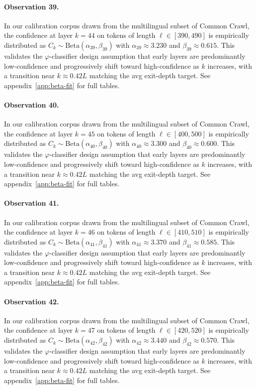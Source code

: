 \paragraph{Observation 39.}
In our calibration corpus drawn from the multilingual subset of Common Crawl,
the confidence at layer $k = 44$ on tokens of length $\ell \in [390, 490]$
is empirically distributed as $C_k \sim \text{Beta}(\alpha_39, \beta_39)$ with
$\alpha_39 \approx 3.230$ and $\beta_39 \approx 0.615$.
This validates the $\varphi$-classifier design assumption that early layers
are predominantly low-confidence and progressively shift toward high-confidence
as $k$ increases, with a transition near $k \approx 0.42 L$ matching the avg
exit-depth target. See appendix~\ref{app:beta-fit} for full tables.

\paragraph{Observation 40.}
In our calibration corpus drawn from the multilingual subset of Common Crawl,
the confidence at layer $k = 45$ on tokens of length $\ell \in [400, 500]$
is empirically distributed as $C_k \sim \text{Beta}(\alpha_40, \beta_40)$ with
$\alpha_40 \approx 3.300$ and $\beta_40 \approx 0.600$.
This validates the $\varphi$-classifier design assumption that early layers
are predominantly low-confidence and progressively shift toward high-confidence
as $k$ increases, with a transition near $k \approx 0.42 L$ matching the avg
exit-depth target. See appendix~\ref{app:beta-fit} for full tables.

\paragraph{Observation 41.}
In our calibration corpus drawn from the multilingual subset of Common Crawl,
the confidence at layer $k = 46$ on tokens of length $\ell \in [410, 510]$
is empirically distributed as $C_k \sim \text{Beta}(\alpha_41, \beta_41)$ with
$\alpha_41 \approx 3.370$ and $\beta_41 \approx 0.585$.
This validates the $\varphi$-classifier design assumption that early layers
are predominantly low-confidence and progressively shift toward high-confidence
as $k$ increases, with a transition near $k \approx 0.42 L$ matching the avg
exit-depth target. See appendix~\ref{app:beta-fit} for full tables.

\paragraph{Observation 42.}
In our calibration corpus drawn from the multilingual subset of Common Crawl,
the confidence at layer $k = 47$ on tokens of length $\ell \in [420, 520]$
is empirically distributed as $C_k \sim \text{Beta}(\alpha_42, \beta_42)$ with
$\alpha_42 \approx 3.440$ and $\beta_42 \approx 0.570$.
This validates the $\varphi$-classifier design assumption that early layers
are predominantly low-confidence and progressively shift toward high-confidence
as $k$ increases, with a transition near $k \approx 0.42 L$ matching the avg
exit-depth target. See appendix~\ref{app:beta-fit} for full tables.

